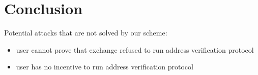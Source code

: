 \section{Conclusion}\label{sec:conclusion}

Potential attacks that are not solved by our scheme:
\begin{itemize}
    \item user cannot prove that exchange refused to run address verification protocol
    \item user has no incentive to run address verification protocol
\end{itemize}

